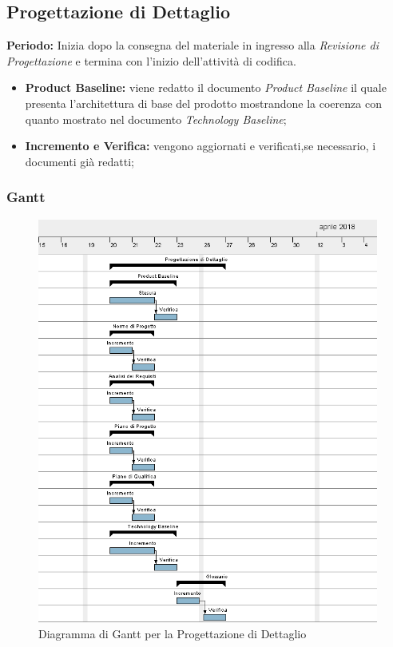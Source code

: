 \subsection{Progettazione di Dettaglio}
    \textbf{Periodo:}
    Inizia dopo la consegna del materiale in ingresso alla \emph{Revisione di Progettazione} e termina con l'inizio dell'attività di codifica.
    \begin{itemize}
    	\item \textbf{Product Baseline:} viene redatto il documento \emph{Product Baseline} il quale presenta l'architettura di base del prodotto mostrandone la coerenza con quanto mostrato nel documento \emph{Technology Baseline};
    	\item \textbf{Incremento e Verifica:} vengono aggiornati e verificati,se necessario, i documenti già redatti;
    \end{itemize}
\subsubsection{Gantt}
\begin{figure}[h!]
	\centering 
	\includegraphics[width=1\textwidth]{images/Progettazione-Dettaglio.png}
	\caption{Diagramma di Gantt per la Progettazione di Dettaglio}
	\label{graficobello4} 
\end{figure}
